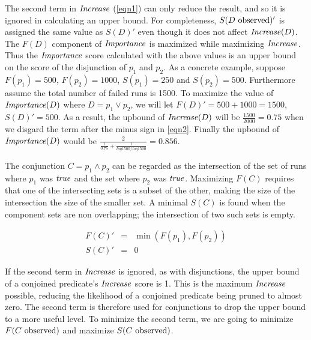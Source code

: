 The second term in $\mathit{Increase}$ (\autoref{eqn1}) can only reduce the result, and so it is ignored in calculating an upper bound.  For completeness, $S(\text{$D$ observed})'$ is assigned the same value as $S(D)'$ even though it does not affect $\mathit{Increase}(D)$.  The $F(D)$ component of $\mathit{Importance}$ is maximized while maximizing $\mathit{Increase}$.  Thus the $\mathit{Importance}$ score calculated with the above values is an upper bound on the score of the disjunction of $p_1$ and $p_2$. As a concrete example, suppose $F(p_1) = 500$, $F(p_2) = 1000$, $S(p_1) = 250$ and $S(p_2) = 500$. Furthermore assume the total number of failed runs is 1500. To maximize the value of $\mathit{Importance}(D)$ where $D = p_1 \vee p_2$,  we will let $F(D)' = 500 + 1000 = 1500$, $S(D)' = 500$. As a result, the upbound of $\mathit{Increase}(D)$ will be $\frac{1500}{2000}=0.75$ when we disgard the term after the minus sign in \autoref{eqn2}. Finally the upbound of $\mathit{Importance}(D)$ would be $\frac{2}{\frac{1}{0.75}+\frac{1}{log1500/log1500}} = 0.856$. 



The conjunction $C = p_1 \wedge p_2$ can be regarded as the intersection of the set of runs where $p_1$ was $\mathit{true}$ and the set where $p_2$ was $\mathit{true}$.  Maximizing $F(C)$ requires that one of the intersecting sets is a subset of the other, making the size of the intersection the size of the smaller set.  A minimal $S(C)$ is found when the component sets are non overlapping; the intersection of two such sets is empty.

\begin{eqnarray*}
  F(C)' &=&  \min(F(p_1),F(p_2)) \\
  S(C)' &=& 0
\end{eqnarray*}

If the second term in $\mathit{Increase}$ is ignored, as with disjunctions, the upper bound of a conjoined predicate's $\mathit{Increase}$ score is 1.  This is the maximum $\mathit{Increase}$ possible, reducing the likelihood of a conjoined predicate being pruned to almost zero.  The second term is therefore used for conjunctions to drop the upper bound to a more useful level. To minimize the second term, we are going to minimize $F(\text{$C$ observed})$ and maximize $S(\text{$C$ observed})$.

